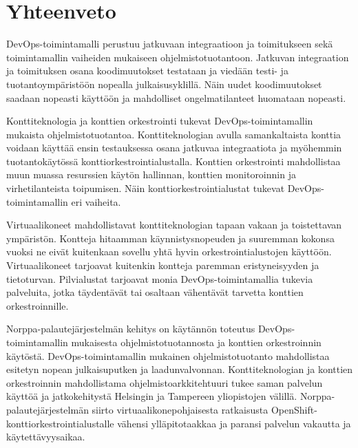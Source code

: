 \chapter{Yhteenveto\label{summary}}

DevOps-toimintamalli perustuu jatkuvaan integraatioon ja toimitukseen sekä toimintamallin vaiheiden mukaiseen ohjelmistotuotantoon.
Jatkuvan integraation ja toimituksen osana koodimuutokset testataan ja viedään testi- ja tuotantoympäristöön nopealla julkaisusyklillä.
Näin uudet koodimuutokset saadaan nopeasti käyttöön ja mahdolliset ongelmatilanteet huomataan nopeasti.

Konttiteknologia ja konttien orkestrointi tukevat DevOps-toimintamallin mukaista ohjelmistotuotantoa.
Konttiteknologian avulla samankaltaista konttia voidaan käyttää ensin testauksessa osana jatkuvaa integraatiota ja myöhemmin tuotantokäytössä konttiorkestrointialustalla.
Konttien orkestrointi mahdollistaa muun muassa resurssien käytön hallinnan, konttien monitoroinnin ja virhetilanteista toipumisen.
Näin konttiorkestrointialustat tukevat DevOps-toimintamallin eri vaiheita.

Virtuaalikoneet mahdollistavat konttiteknologian tapaan vakaan ja toistettavan ympäristön.
Kontteja hitaamman käynnistysnopeuden ja suuremman kokonsa vuoksi ne eivät kuitenkaan sovellu yhtä hyvin orkestrointialustojen käyttöön.
Virtuaalikoneet tarjoavat kuitenkin kontteja paremman eristyneisyyden ja tietoturvan.
Pilvialustat tarjoavat monia DevOps-toimintamallia tukevia palveluita, jotka täydentävät tai osaltaan vähentävät tarvetta konttien orkestroinnille.

Norppa-palautejärjestelmän kehitys on käytännön toteutus DevOps-toimintamallin mukaisesta ohjelmistotuotannosta ja konttien orkestroinnin käytöstä.
DevOps-toimintamallin mukainen ohjelmistotuotanto mahdollistaa esitetyn nopean julkaisuputken ja laadunvalvonnan.
Konttiteknologian ja konttien orkestroinnin mahdollistama ohjelmistoarkkitehtuuri tukee saman palvelun käyttöä ja jatkokehitystä Helsingin ja Tampereen yliopistojen välillä.
Norppa-palautejärjestelmän siirto virtuaalikonepohjaisesta ratkaisusta OpenShift-konttiorkestrointialustalle vähensi ylläpitotaakkaa ja paransi palvelun vakautta ja käytettävyysaikaa.
